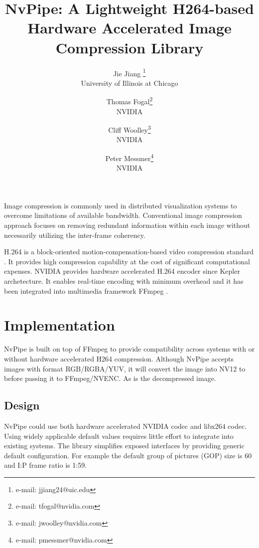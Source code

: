 \documentclass[review]{vgtc}                 %
\title{NvPipe: A Lightweight H264-based Hardware Accelerated Image Compression Library}
\author{Jie Jiang \thanks{e-mail: jjiang24@uic.edu}\\ %
        \scriptsize University of Illinois at Chicago %
\and Thomas Fogal\thanks{e-mail: tfogal@nvidia.com}\\ %
     \scriptsize NVIDIA %
\and Cliff Woolley\thanks{e-mail: jwoolley@nvidia.com}\\ %
     \scriptsize NVIDIA %
\and Peter Messmer\thanks{e-mail: pmessmer@nvidia.com}\\ %
     \scriptsize NVIDIA} %
\begin{document}


\maketitle

Image compression is commonly used in distributed visualization systems to overcome limitations of available bandwidth. Conventional image compression approach focuses on removing redundant information within each image without necessarily utilizing the inter-frame coherency.

H.264 is a block-oriented motion-compensation-based video compression standard \cite{wiegand2003overview}. It provides high compression capability at the cost of significant computational expenses. NVIDIA provides hardware accelerated H.264 encoder since Kepler archetecture. It enables real-time encoding with minimum overhead and it has been integrated into multimedia framework FFmpeg \cite{ffmpeg}. 

\section{Implementation}

NvPipe is built on top of FFmpeg to provide compatibility across systems with or without hardware accelerated H264 compression. Although NvPipe accepts images with format RGB/RGBA/YUV, it will convert the image into NV12 to before passing it to FFmpeg/NVENC. As is the decompressed image.

\subsection{Design}

NvPipe could use both hardware accelerated NVIDIA codec and libx264 codec. Using widely applicable default values requires little effort to integrate into existing systems. The library simplifies exposed interfaces by providing generic default configuration. For example the default group of pictures (GOP) size is 60 and I:P frame ratio is 1:59.
\end{document}
